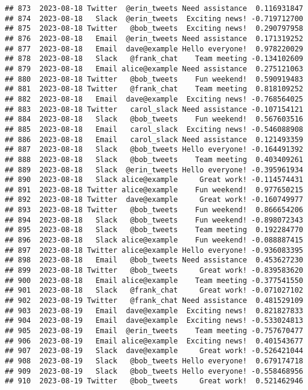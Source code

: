 \documentclass[
]{article}
\begin{document}
\begin{verbatim}
## 873  2023-08-18 Twitter  @erin_tweets Need assistance  0.116931847
## 874  2023-08-18   Slack  @erin_tweets  Exciting news! -0.719712700
## 875  2023-08-18 Twitter   @bob_tweets  Exciting news!  0.290797958
## 876  2023-08-18   Email  @erin_tweets Need assistance  0.171319252
## 877  2023-08-18   Email  dave@example Hello everyone!  0.978220029
## 878  2023-08-18   Slack   @frank_chat    Team meeting -0.134102609
## 879  2023-08-18   Email alice@example Need assistance  0.275121063
## 880  2023-08-18 Twitter   @bob_tweets    Fun weekend!  0.590919483
## 881  2023-08-18 Twitter   @frank_chat    Team meeting  0.818109252
## 882  2023-08-18   Email  dave@example  Exciting news! -0.768564025
## 883  2023-08-18 Twitter   carol_slack Need assistance -0.107154121
## 884  2023-08-18   Slack   @bob_tweets    Fun weekend!  0.567603516
## 885  2023-08-18   Email   carol_slack  Exciting news! -0.546088908
## 886  2023-08-18   Email   carol_slack Need assistance  0.121493359
## 887  2023-08-18   Slack   @bob_tweets Hello everyone! -0.164491392
## 888  2023-08-18   Slack   @bob_tweets    Team meeting  0.403409261
## 889  2023-08-18   Slack  @erin_tweets Hello everyone! -0.395961934
## 890  2023-08-18   Slack alice@example     Great work! -0.114574431
## 891  2023-08-18 Twitter alice@example    Fun weekend!  0.977650215
## 892  2023-08-18 Twitter  dave@example     Great work! -0.160749977
## 893  2023-08-18 Twitter   @bob_tweets    Fun weekend!  0.866654206
## 894  2023-08-18   Slack   @bob_tweets    Fun weekend! -0.898072343
## 895  2023-08-18   Slack   @bob_tweets    Team meeting  0.192284770
## 896  2023-08-18   Slack alice@example    Fun weekend! -0.088887415
## 897  2023-08-18 Twitter alice@example Hello everyone! -0.936083395
## 898  2023-08-18   Email   @bob_tweets Need assistance  0.453627230
## 899  2023-08-18 Twitter   @bob_tweets     Great work! -0.839583620
## 900  2023-08-18   Email alice@example    Team meeting -0.377541550
## 901  2023-08-18   Slack   @frank_chat     Great work! -0.071027102
## 902  2023-08-19 Twitter   @frank_chat Need assistance  0.481529109
## 903  2023-08-19   Email  dave@example  Exciting news!  0.821827833
## 904  2023-08-19   Email  dave@example  Exciting news! -0.533024813
## 905  2023-08-19   Email  @erin_tweets    Team meeting -0.757670477
## 906  2023-08-19   Email alice@example  Exciting news!  0.401543677
## 907  2023-08-19   Slack  dave@example     Great work! -0.526421044
## 908  2023-08-19   Slack   @bob_tweets Hello everyone!  0.679174718
## 909  2023-08-19   Slack   @bob_tweets Hello everyone! -0.558468956
## 910  2023-08-19 Twitter   @bob_tweets     Great work!  0.521462946

\end{verbatim}
\end{document}

